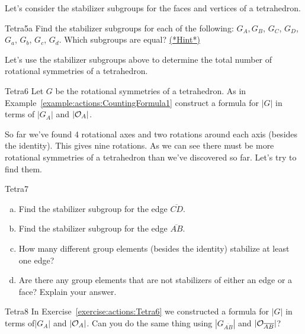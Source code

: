 Let's consider the stabilizer subgroups for the faces and vertices of a tetrahedron. 

\begin{exercise}{Tetra5a}
Find the stabilizer subgroups for each of the following:
$G_{A},  G_{B}$, $G_{C}$, $G_{D}$, $G_{a}$, $G_{b}$, $G_{c}$, $G_{d}$. Which subgroups are equal?
\hyperref[sec:actions:hints]{(*Hint*)}
\end{exercise}

Let's use the stabilizer subgroups above to determine the total number of rotational symmetries of a tetrahedron.  

\begin{exercise}{Tetra6} 
Let $G$ be the rotational symmetries of a tetrahedron.  As in Example~\ref{example:actions:CountingFormula1} construct a formula for $|G|$ in terms of $| G_{A}|$ and $|{\cal O}_{A}|$.  \end {exercise}
So far we've found 4 rotational axes and two rotations around each axis (besides the identity). This gives nine rotations.  As we can see there must be more rotational symmetries of a tetrahedron than we've discovered so far.  Let's try to find them. 

\begin {exercise}{Tetra7}
\begin {enumerate}[(a)]
\item Find the stabilizer subgroup for the edge $\overline{CD}$. 
\item Find the stabilizer subgroup for the edge $\overline{AB}$.
\item How many different group elements (besides the identity) stabilize at least one edge?
\item Are there any group elements that are not stabilizers of either an edge or a face?  Explain your answer.
\end{enumerate}
\end{exercise}	

\begin {exercise}{Tetra8}
In Exercise~\ref{exercise:actions:Tetra6} we constructed a formula for $|G|$ in terms of$| G_{A}|$ and $|{\cal O}_{A}|$.  Can you do the same thing using $| G_{\overline{AB}}|$ and $|{\cal O}_{\overline{AB}}|$?
\end{exercise}

